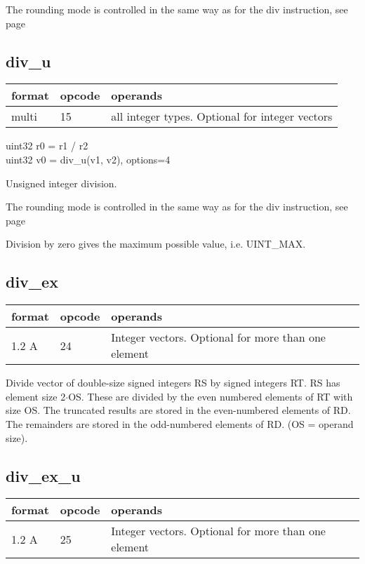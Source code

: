 \documentclass[forwardcom.tex]{subfiles}
\begin{document}
The rounding mode is controlled in the same way as for the div instruction, see page \pageref{table:DivInstructions}
\vv

\subsection{div\_u}
\label{table:divUInstruction}
\begin{tabular}{|p{12mm}|p{15mm}|p{100mm}|}
\hline
\bfseries format & \bfseries opcode & \bfseries operands \\ \hline
multi & 15 & all integer types. Optional for integer vectors \\ \hline
\end{tabular}
\vv

uint32 r0 = r1 / r2 \\
uint32 v0 = div\_u(v1, v2), options=4
\vv

Unsigned integer division.

The rounding mode is controlled in the same way as for the div instruction, see page \pageref{table:DivInstructions}

\vv
Division by zero gives the maximum possible value, i.e. UINT\_MAX.
\vv


\subsection{div\_ex}
\label{table:divExInstruction}
\begin{tabular}{|p{12mm}|p{15mm}|p{100mm}|}
\hline
\bfseries format & \bfseries opcode & \bfseries operands \\ \hline
1.2 A & 24 & Integer vectors. Optional for more than one element \\ \hline
\end{tabular}
\vv

Divide vector of double-size signed integers RS by signed integers RT. RS has element size 2$\cdot$OS. These are divided by the even numbered
elements of RT with size OS. The truncated results are stored in the even-numbered elements of RD. The remainders are stored in the odd-numbered elements of RD.
(OS = operand size).
\vv


\subsection{div\_ex\_u}
\label{table:divExUInstruction}
\begin{tabular}{|p{12mm}|p{15mm}|p{100mm}|}
\hline
\bfseries format & \bfseries opcode & \bfseries operands \\ \hline
1.2 A & 25 & Integer vectors. Optional for more than one element \\ \hline
\end{tabular}
\vv
\end{document}

